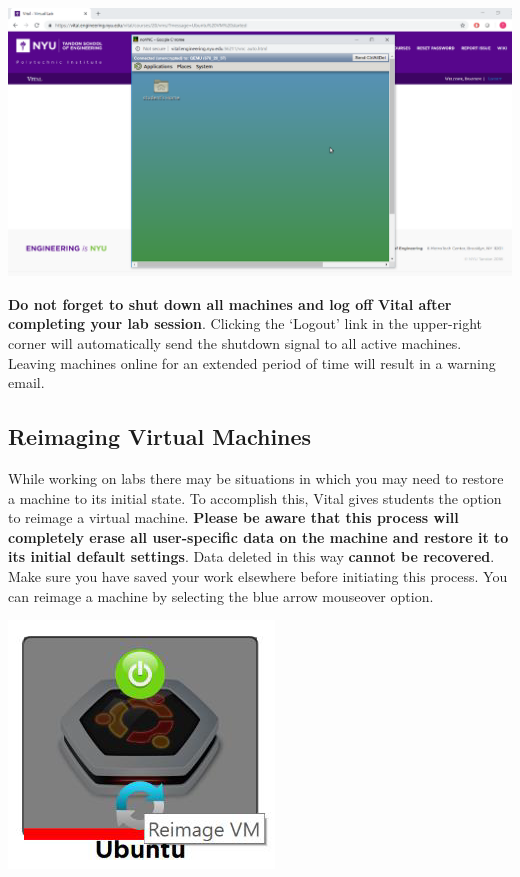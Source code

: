 \documentclass[12pt]{article}
\begin{document}
{%
\centering
\includegraphics[scale=0.30]{vm_interface.png}

}

\textbf{Do not forget to shut down all machines and log off Vital after completing your lab session}. Clicking the ‘Logout’ link in the upper-right corner will automatically send the shutdown signal to all active machines. Leaving machines online for an extended period of time will result in a warning email.


\subsection*{Reimaging Virtual Machines}
While working on labs there may be situations in which you may need to restore a machine to its initial state. To accomplish this, Vital gives students the option to reimage a virtual machine. \textbf{Please be aware that this process will completely erase all user-specific data on the machine and restore it to its initial default settings}. Data deleted in this way \textbf{cannot be recovered}. Make sure you have saved your work elsewhere before initiating this process.  You can reimage a machine by selecting the blue arrow mouseover option.


{%
\centering
\includegraphics[scale=0.50]{reimage_vm.png}

}
\end{document}

